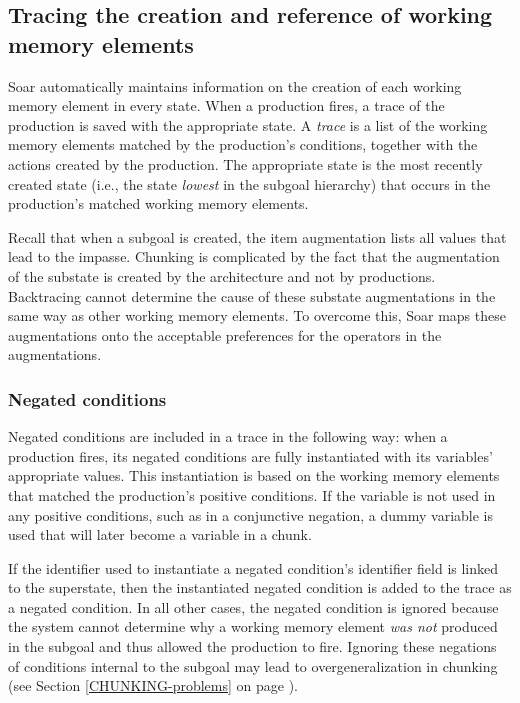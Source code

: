 \subsection{Tracing the creation and reference of working memory elements} 

Soar automatically maintains information on the creation of each 
working memory element in every state.  When a production fires, a
trace of the production is saved with the appropriate state. A \emph{trace} is
a list of the working memory elements matched by the production's conditions,
together with the actions created by the production.  The appropriate state
is the most recently created state (i.e., the state \emph{lowest} in the
subgoal hierarchy) that occurs in the production's matched working memory
elements.

Recall that when a subgoal is created, the \carat item augmentation lists all
values that lead to the impasse.
Chunking is complicated by the fact that the  augmentation
of the substate is created by the architecture and not by productions.
Backtracing cannot determine the cause of these substate augmentations in the
same way as other working memory elements. To overcome this, Soar maps these
augmentations onto the acceptable preferences for the operators in the 
 augmentations.


\subsubsection*{Negated conditions}

Negated conditions are included in a trace in the following way: when a
production fires, its negated conditions are fully instantiated with its
variables' appropriate values. This instantiation is based on the working
memory elements that matched the production's positive conditions. If the
variable is not used in any positive conditions, such as in a conjunctive
negation, a dummy variable is used that will later become a variable in a
chunk.

If the identifier used to instantiate a negated condition's identifier field
is linked to the superstate, then the instantiated negated condition is
added to the trace as a negated condition. In all other cases, the negated
condition is ignored because the system cannot determine why a working memory
element \emph{was not} produced in the subgoal and thus allowed the production
to fire. Ignoring these negations of conditions internal to the subgoal may
lead to overgeneralization in chunking (see Section \ref{CHUNKING-problems} on
page \pageref{CHUNKING-problems}). 
     
